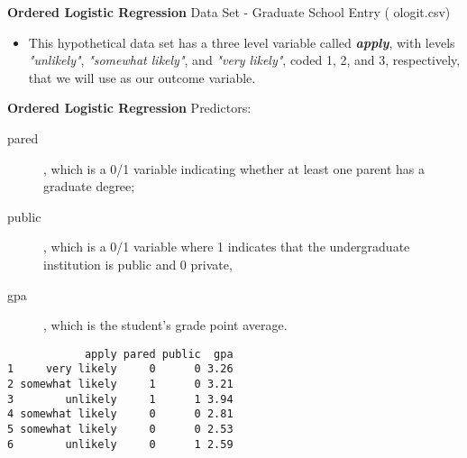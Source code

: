 \documentclass[00-GLMregslides.tex]{subfiles}
\begin{document}
\begin{frame}
\textbf{Ordered Logistic Regression}
Data Set - Graduate School Entry ( ologit.csv)
\begin{itemize}
\item 
This hypothetical data set has a three level variable called \textbf{\textit{apply}}, with levels \textit{"unlikely"}, \textit{"somewhat likely"}, and \textit{"very likely"}, coded 1, 2, and 3, respectively, 
that we will use as our outcome variable. 
\end{itemize}
\end{frame}
\begin{frame}
\textbf{Ordered Logistic Regression}
Predictors:
\begin{description}
\item[pared], which is a 0/1 variable indicating whether at least 
one parent has a graduate degree; 
\item[public], which is a 0/1 variable where 1 indicates that the undergraduate institution is public and 0 private, 
\item[gpa], which is 
the student's grade point average. 
\end{description}
\end{frame}
\begin{frame}[fragile]

\begin{verbatim}
            apply pared public  gpa
1     very likely     0      0 3.26
2 somewhat likely     1      0 3.21
3        unlikely     1      1 3.94
4 somewhat likely     0      0 2.81
5 somewhat likely     0      0 2.53
6        unlikely     0      1 2.59
\end{verbatim}
\end{frame}
\end{document}
